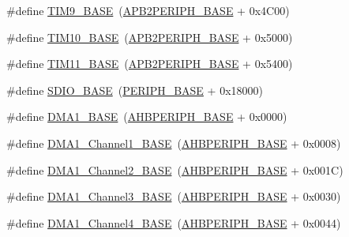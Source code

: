 \begin{DoxyCompactItemize}
\item 
\#define \mbox{\hyperlink{group___peripheral__memory__map_ga92ae902be7902560939223dd765ece08}{T\+I\+M9\+\_\+\+B\+A\+SE}}~(\mbox{\hyperlink{group___peripheral__memory__map_ga25b99d6065f1c8f751e78f43ade652cb}{A\+P\+B2\+P\+E\+R\+I\+P\+H\+\_\+\+B\+A\+SE}} + 0x4\+C00)
\item 
\#define \mbox{\hyperlink{group___peripheral__memory__map_ga3eff32f3801db31fb4b61d5618cad54a}{T\+I\+M10\+\_\+\+B\+A\+SE}}~(\mbox{\hyperlink{group___peripheral__memory__map_ga25b99d6065f1c8f751e78f43ade652cb}{A\+P\+B2\+P\+E\+R\+I\+P\+H\+\_\+\+B\+A\+SE}} + 0x5000)
\item 
\#define \mbox{\hyperlink{group___peripheral__memory__map_ga3a4a06bb84c703084f0509e105ffaf1d}{T\+I\+M11\+\_\+\+B\+A\+SE}}~(\mbox{\hyperlink{group___peripheral__memory__map_ga25b99d6065f1c8f751e78f43ade652cb}{A\+P\+B2\+P\+E\+R\+I\+P\+H\+\_\+\+B\+A\+SE}} + 0x5400)
\item 
\#define \mbox{\hyperlink{group___peripheral__memory__map_ga95dd0abbc6767893b4b02935fa846f52}{S\+D\+I\+O\+\_\+\+B\+A\+SE}}~(\mbox{\hyperlink{group___peripheral__memory__map_ga9171f49478fa86d932f89e78e73b88b0}{P\+E\+R\+I\+P\+H\+\_\+\+B\+A\+SE}} + 0x18000)
\item 
\#define \mbox{\hyperlink{group___peripheral__memory__map_gab2d8a917a0e4ea99a22ac6ebf279bc72}{D\+M\+A1\+\_\+\+B\+A\+SE}}~(\mbox{\hyperlink{group___peripheral__memory__map_ga92eb5d49730765d2abd0f5b09548f9f5}{A\+H\+B\+P\+E\+R\+I\+P\+H\+\_\+\+B\+A\+SE}} + 0x0000)
\item 
\#define \mbox{\hyperlink{group___peripheral__memory__map_ga888dbc1608243badeb3554ffedc7364c}{D\+M\+A1\+\_\+\+Channel1\+\_\+\+B\+A\+SE}}~(\mbox{\hyperlink{group___peripheral__memory__map_ga92eb5d49730765d2abd0f5b09548f9f5}{A\+H\+B\+P\+E\+R\+I\+P\+H\+\_\+\+B\+A\+SE}} + 0x0008)
\item 
\#define \mbox{\hyperlink{group___peripheral__memory__map_ga38a70090eef3687e83fa6ac0c6d22267}{D\+M\+A1\+\_\+\+Channel2\+\_\+\+B\+A\+SE}}~(\mbox{\hyperlink{group___peripheral__memory__map_ga92eb5d49730765d2abd0f5b09548f9f5}{A\+H\+B\+P\+E\+R\+I\+P\+H\+\_\+\+B\+A\+SE}} + 0x001\+C)
\item 
\#define \mbox{\hyperlink{group___peripheral__memory__map_ga70b3d9f36ca9ce95b4e421c11154fe5d}{D\+M\+A1\+\_\+\+Channel3\+\_\+\+B\+A\+SE}}~(\mbox{\hyperlink{group___peripheral__memory__map_ga92eb5d49730765d2abd0f5b09548f9f5}{A\+H\+B\+P\+E\+R\+I\+P\+H\+\_\+\+B\+A\+SE}} + 0x0030)
\item 
\#define \mbox{\hyperlink{group___peripheral__memory__map_ga1adc93cd0baf0897202c71110e045692}{D\+M\+A1\+\_\+\+Channel4\+\_\+\+B\+A\+SE}}~(\mbox{\hyperlink{group___peripheral__memory__map_ga92eb5d49730765d2abd0f5b09548f9f5}{A\+H\+B\+P\+E\+R\+I\+P\+H\+\_\+\+B\+A\+SE}} + 0x0044)

\end{DoxyCompactItemize}
